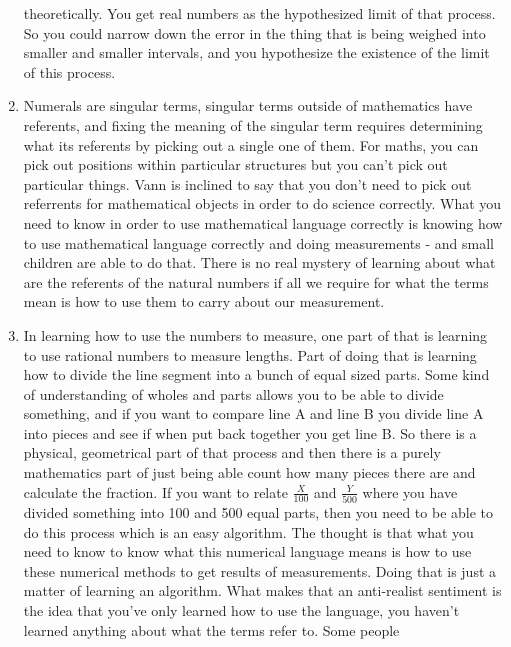 \documentclass[12pt]{article}
\theoremstyle{definition}
\begin{document}
\begin{enumerate}
        theoretically. You get real numbers as the hypothesized limit of that
        process. So you could narrow down the error in the thing that is being
        weighed into smaller and smaller intervals, and you hypothesize the
        existence of the limit of this process.
    \item
        Numerals are singular terms, singular terms outside of mathematics have
        referents, and fixing the meaning of the singular term requires
        determining what its referents by picking out a single one of them. For
        maths, you can pick out positions within particular structures but you
        can't pick out particular things. Vann is inclined to say that you
        don't need to pick out referrents for mathematical objects in order to
        do science correctly. What you need to know in order to use
        mathematical language correctly is knowing how to use mathematical
        language correctly and doing measurements - and small children are able
        to do that. There is no real mystery of learning about what are the
        referents of the natural numbers if all we require for what the terms
        mean is how to use them to carry about our measurement.
    \item
        In learning how to use the numbers to measure, one part of that is
        learning to use rational numbers to measure lengths. Part of doing that
        is learning how to divide the line segment into a bunch of equal sized
        parts. Some kind of understanding of wholes and parts allows you to be
        able to divide something, and if you want to compare line A and line B
        you divide line A into pieces and see if when put back together you get
        line B. So there is a physical, geometrical part of that process and
        then there is a purely mathematics part of just being able count how
        many pieces there are and calculate the fraction. If you want to relate
        $\frac{X}{100}$ and $\frac{Y}{500}$ where you have divided something
        into 100 and 500 equal parts, then you need to be able to do this
        process which is an easy algorithm. The thought is that what you need
        to know to know what this numerical language means is how to use these
        numerical methods to get results of measurements. Doing that is just a
        matter of learning an algorithm. What makes that an anti-realist
        sentiment is the idea that you've only learned how to use the language,
        you haven't learned anything about what the terms refer to. Some people

\end{enumerate}
\end{document}
